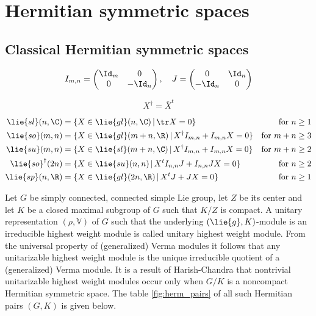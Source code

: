 \chapter{Hermitian symmetric spaces}

\section{Classical Hermitian symmetric spaces}

\[
 I_{m,n} = \begin{pmatrix} \Id_m & 0 \\ 0 & -\Id_n \end{pmatrix}, \quad J = \begin{pmatrix} 0 & \Id_n \\ -\Id_n & 0 \end{pmatrix}
\]

\[X^\dag = \overline{X}^t\]

\begin{equation}\label{eq:algebras_definition}
\begin{aligned}
 \lie{sl}(n,\C) &= \{ X \in \lie{gl}(n,\C) \,|\, \tr X = 0 \} & \text{for } n \geq 1\\
 \lie{so}(m,n)  &= \{ X\in \lie{gl}(m+n,\R) \,|\, X^\dag I_{m,n}+I_{m,n}X = 0 \} & \text{for } m+n\geq 3\\
 \lie{su}(m,n)  &= \{ X \in \lie{sl}(m+n,\C)  \,|\, X^\dag I_{m,n}+I_{m,n}X = 0 \} & \text{for } m+n \geq 2\\
 \lie{so}^\dag(2n) &= \{ X \in \lie{su}(n,n) \,|\, X^t I_{n,n}J + I_{n,n} JX = 0 \} & \text{for } n \geq 2\\
 \lie{sp}(n,\R) &= \{ X \in \lie{gl}(2n,\R) \,|\, X^tJ + JX = 0 \} & \text{for } n\geq 1
\end{aligned}
\end{equation}


Let $G$ be simply connected, connected simple Lie group, let $Z$ be its center and let $K$ be a closed  maximal subgroup of $G$ such that $K/Z$ is compact. A unitary representation $(\rho,\mathbb{V})$  of $G$ such that the underlying $(\lie{g},K)$-module is an irreducible highest weight module is called unitary highest weight module. From the universal property of (generalized) Verma modules it follows that any unitarizable highest weight module is the unique irreducible quotient of a (generalized) Verma module. It is a result of Harish-Chandra that nontrivial unitarizable highest weight modules occur only when $G/K$ is a noncompact Hermitian symmetric space. The table \ref{fig:herm_pairs} of all such Hermitian pairs $(G,K)$ is given below.

